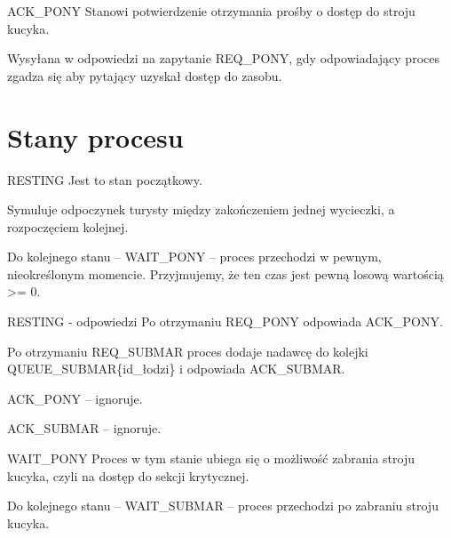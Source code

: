 \documentclass{beamer}
\begin{document}
\begin{frame}{ACK\_PONY}
    \internallinenumbers
    \resetlinenumber[1]
    Stanowi potwierdzenie otrzymania prośby o dostęp do stroju kucyka.

    \vspace{1cm}
    Wysyłana w odpowiedzi na zapytanie REQ\_PONY, gdy odpowiadający proces zgadza się aby pytający uzyskał dostęp do zasobu.
\end{frame}

\section{Stany procesu}
\begin{frame}{RESTING}
    \internallinenumbers
    \resetlinenumber[1]
    Jest to stan początkowy.

    \vspace{1cm}
    Symuluje odpoczynek turysty między zakończeniem jednej wycieczki, a rozpoczęciem kolejnej.

    \vspace{1cm}
    Do kolejnego stanu – WAIT\_PONY – proces przechodzi w pewnym, nieokreślonym momencie. Przyjmujemy, że ten czas jest pewną losową wartością >= 0.
\end{frame}

\begin{frame}{RESTING - odpowiedzi}
    \internallinenumbers
    \resetlinenumber[1]
    Po otrzymaniu REQ\_PONY odpowiada ACK\_PONY.

    \vspace{1cm}
    Po otrzymaniu REQ\_SUBMAR proces dodaje nadawcę do kolejki QUEUE\_SUBMAR\{id\_łodzi\} i odpowiada ACK\_SUBMAR.

    \vspace{1cm}
    ACK\_PONY – ignoruje.

    \vspace{1cm}
    ACK\_SUBMAR – ignoruje.
\end{frame}

\begin{frame}{WAIT\_PONY}
    \internallinenumbers
    \resetlinenumber[1]
    Proces w tym stanie ubiega się o  możliwość zabrania stroju kucyka, czyli na dostęp do sekcji krytycznej.

    \vspace{1cm}
    Do kolejnego stanu – WAIT\_SUBMAR – proces przechodzi po zabraniu stroju kucyka.    
\end{frame}
\end{document}
